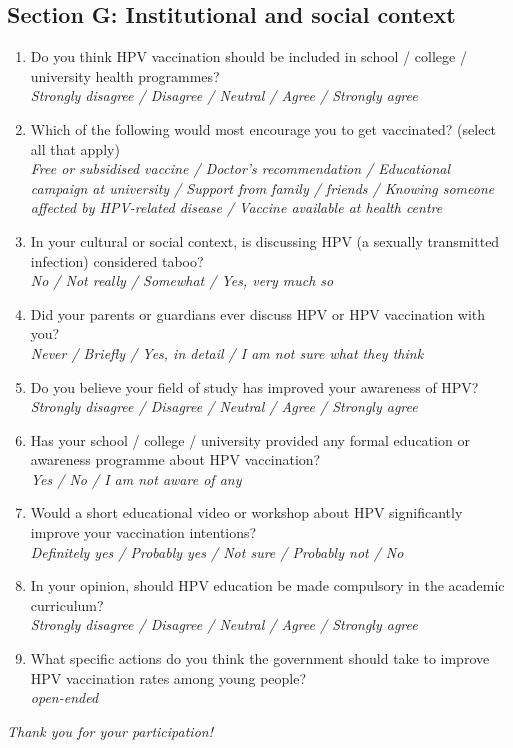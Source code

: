 \subsection*{Section G: Institutional and social context}
\begin{enumerate}[leftmargin=*,itemsep=3pt]
\item Do you think HPV vaccination should be included in school / college / university health programmes?\\\hspace*{1em}\textit{Strongly disagree / Disagree / Neutral / Agree / Strongly agree}
\item Which of the following would most encourage you to get vaccinated? (select all that apply)\\\hspace*{1em}\textit{Free or subsidised vaccine / Doctor's recommendation / Educational campaign at university / Support from family / friends / Knowing someone affected by HPV-related disease / Vaccine available at health centre}
\item In your cultural or social context, is discussing HPV (a sexually transmitted infection) considered taboo?\\\hspace*{1em}\textit{No / Not really / Somewhat / Yes, very much so}
\item Did your parents or guardians ever discuss HPV or HPV vaccination with you?\\\hspace*{1em}\textit{Never / Briefly / Yes, in detail / I am not sure what they think}
\item Do you believe your field of study has improved your awareness of HPV?\\\hspace*{1em}\textit{Strongly disagree / Disagree / Neutral / Agree / Strongly agree}
\item Has your school / college / university provided any formal education or awareness programme about HPV vaccination?\\\hspace*{1em}\textit{Yes / No / I am not aware of any}
\item Would a short educational video or workshop about HPV significantly improve your vaccination intentions?\\\hspace*{1em}\textit{Definitely yes / Probably yes / Not sure / Probably not / No}
\item In your opinion, should HPV education be made compulsory in the academic curriculum?\\\hspace*{1em}\textit{Strongly disagree / Disagree / Neutral / Agree / Strongly agree}
\item What specific actions do you think the government should take to improve HPV vaccination rates among young people?\\\hspace*{1em}\textit{open-ended}
\end{enumerate}
\vspace{6pt}\textit{Thank you for your participation!}
\normalsize
\clearpage\onehalfspacing\normalsize

